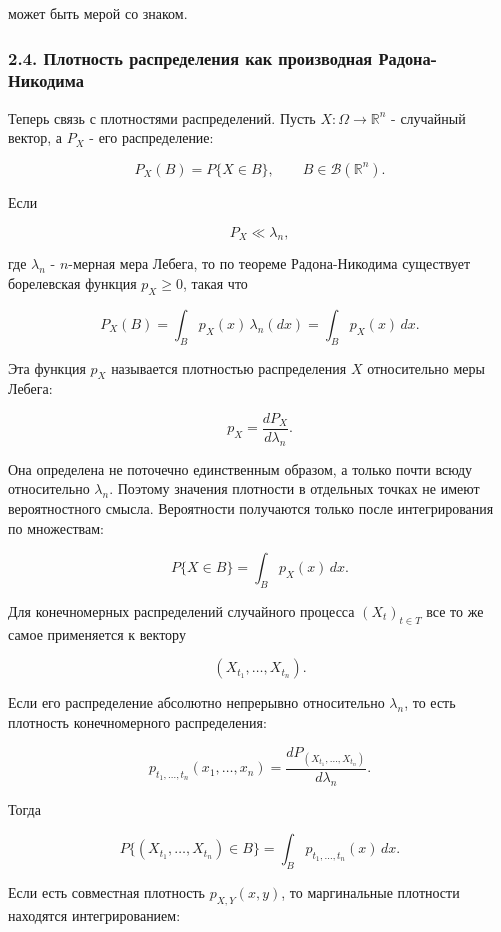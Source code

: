 \documentclass[
  11pt,
  a4paper,
]{article}
\begin{document}
может быть мерой со знаком.

\subsubsection{2.4. Плотность распределения как производная
Радона-Никодима}\label{ux43fux43bux43eux442ux43dux43eux441ux442ux44c-ux440ux430ux441ux43fux440ux435ux434ux435ux43bux435ux43dux438ux44f-ux43aux430ux43a-ux43fux440ux43eux438ux437ux432ux43eux434ux43dux430ux44f-ux440ux430ux434ux43eux43dux430-ux43dux438ux43aux43eux434ux438ux43cux430}

Теперь связь с плотностями распределений. Пусть
\(X:\Omega\to\mathbb R^n\) - случайный вектор, а \(P_X\) - его
распределение:

\[
P_X(B)=P\{X\in B\},
\qquad
B\in\mathcal B(\mathbb R^n).
\]

Если

\[
P_X\ll\lambda_n,
\]

где \(\lambda_n\) - \(n\)-мерная мера Лебега, то по теореме
Радона-Никодима существует борелевская функция \(p_X\ge0\), такая что

\[
P_X(B)=\int_B p_X(x)\,\lambda_n(dx)
=
\int_B p_X(x)\,dx.
\]

Эта функция \(p_X\) называется плотностью распределения \(X\)
относительно меры Лебега:

\[
p_X=\frac{dP_X}{d\lambda_n}.
\]

Она определена не поточечно единственным образом, а только почти всюду
относительно \(\lambda_n\). Поэтому значения плотности в отдельных
точках не имеют вероятностного смысла. Вероятности получаются только
после интегрирования по множествам:

\[
P\{X\in B\}=\int_B p_X(x)\,dx.
\]

Для конечномерных распределений случайного процесса \((X_t)_{t\in T}\)
все то же самое применяется к вектору

\[
(X_{t_1},\ldots,X_{t_n}).
\]

Если его распределение абсолютно непрерывно относительно \(\lambda_n\),
то есть плотность конечномерного распределения:

\[
p_{t_1,\ldots,t_n}(x_1,\ldots,x_n)
=
\frac{dP_{(X_{t_1},\ldots,X_{t_n})}}{d\lambda_n}.
\]

Тогда

\[
P\{(X_{t_1},\ldots,X_{t_n})\in B\}
=
\int_B p_{t_1,\ldots,t_n}(x)\,dx.
\]

Если есть совместная плотность \(p_{X,Y}(x,y)\), то маргинальные
плотности находятся интегрированием:
\end{document}
